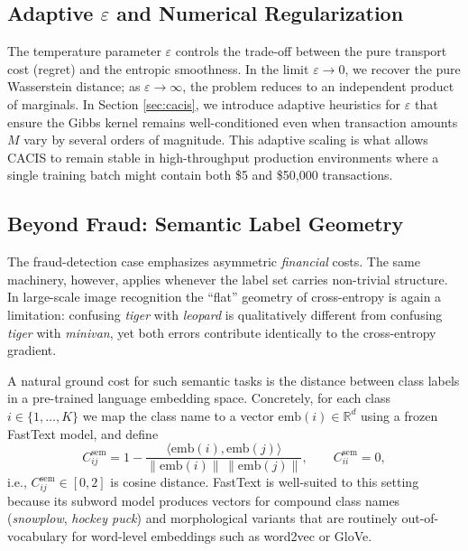 \documentclass[sigconf,anonymous]{acmart}
\newcommand{\CACIS}{\textsc{CACIS}}
\newcommand{\R}{\mathbb{R}}
\begin{document}
\subsection{Adaptive $\varepsilon$ and Numerical Regularization}
The temperature parameter $\varepsilon$ controls the trade-off between the pure transport cost (regret) and the entropic smoothness. In the limit $\varepsilon \to 0$, we recover the pure Wasserstein distance; as $\varepsilon \to \infty$, the problem reduces to an independent product of marginals. In Section \ref{sec:cacis}, we introduce adaptive heuristics for $\varepsilon$ that ensure the Gibbs kernel remains well-conditioned even when transaction amounts $M$ vary by several orders of magnitude. This adaptive scaling is what allows \CACIS{} to remain stable in high-throughput production environments where a single training batch might contain both \$5 and \$50,000 transactions.

\subsection{Beyond Fraud: Semantic Label Geometry}
\label{sec:semantic-geometry}
The fraud-detection case emphasizes asymmetric \emph{financial} costs. The same machinery, however, applies whenever the label set carries non-trivial structure. In large-scale image recognition the ``flat'' geometry of cross-entropy is again a limitation: confusing \emph{tiger} with \emph{leopard} is qualitatively different from confusing \emph{tiger} with \emph{minivan}, yet both errors contribute identically to the cross-entropy gradient.

A natural ground cost for such semantic tasks is the distance between class labels in a pre-trained language embedding space. Concretely, for each class $i \in \{1, \dots, K\}$ we map the class name to a vector $\mathrm{emb}(i) \in \R^d$ using a frozen FastText \citep{bojanowski2017enriching} model, and define
\begin{equation}
\label{eq:semantic-cost}
C_{ij}^{\mathrm{sem}} = 1 - \frac{\langle \mathrm{emb}(i), \mathrm{emb}(j) \rangle}{\|\mathrm{emb}(i)\|\,\|\mathrm{emb}(j)\|}, \qquad C_{ii}^{\mathrm{sem}} = 0,
\end{equation}
i.e., $C^{\mathrm{sem}}_{ij} \in [0, 2]$ is cosine distance. FastText is well-suited to this setting because its subword model produces vectors for compound class names (\emph{snowplow}, \emph{hockey puck}) and morphological variants that are routinely out-of-vocabulary for word-level embeddings such as word2vec or GloVe.
\end{document}

